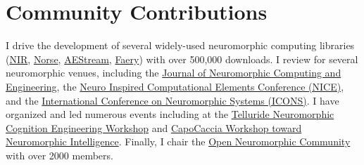 \documentclass[11pt, a4paper]{article}
\newcommand{\years}[1]{\marginnote{\scriptsize #1}}
\begin{document}
\section*{Community Contributions}
I drive the development of several widely-used neuromorphic computing libraries (\href{https://github.com/neuromorphs/NIR}{NIR}, \href{https://github.com/norse/}{Norse}, \href{https://github.com/aestream}{AEStream}, \href{https://github.com/aestream/faery}{Faery}) with over 500,000 downloads.
I review for several neuromorphic venues, including the \href{https://iopscience.iop.org/journal/2634-4386}{Journal of Neuromorphic Computing and Engineering}, the \href{https://niceworkshop.org/}{Neuro Inspired Computational Elements Conference (NICE)}, and the \href{https://iconsneuromorphic.cc/}{International Conference on Neuromorphic Systems (ICONS)}.
I have organized and led numerous events including at the \href{https://sites.google.com/view/telluride-2024/}{Telluride Neuromorphic Cognition Engineering Workshop} and \href{https://capocaccia.cc/en/}{CapoCaccia Workshop toward Neuromorphic Intelligence}.
Finally, I chair the \href{https://open-neuromorphic.org/}{Open Neuromorphic Community} with over 2000 members.
\end{document}

